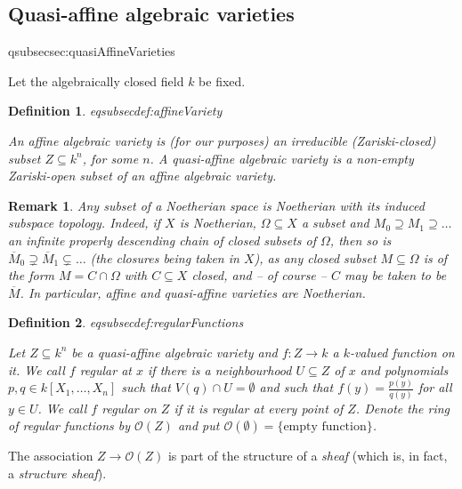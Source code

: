 \documentclass[DIV=14,parskip=full,pointednumbers]{scrartcl}
\theoremstyle{cthm}
\theoremstyle{cvarthm}
\theoremstyle{cdef}
\newtheorem{defi}{Definition}[subsection]
\newtheorem{rem}{Remark}[subsection]
\newcommand{\lbl}[1]{
	\label{#1}
	\ifmmode
	\expandafter\xdef\csname eqsubsec#1\endcsname{\thesubsection}
	\fi
}
\newcommand{\Oo}{\mathcal{O}}
\newcommand{\ov}{\overline}
\begin{document}
	\subsection{Quasi-affine algebraic varieties}\lbl{sec:quasiAffineVarieties}
	Let the algebraically closed field $k$ be fixed.
	\begin{defi}\lbl{def:affineVariety}
		An \emph{affine algebraic variety} is (for our purposes) an irreducible (Zariski-closed) subset $Z\subseteq k^n$, for some $n$. A \emph{quasi-affine algebraic variety} is a non-empty Zariski-open subset of an affine algebraic variety.
	\end{defi}
	\begin{rem}
		Any subset of a Noetherian space is Noetherian with its induced subspace topology. Indeed, if $X$ is Noetherian, $\Omega\subseteq X$ a subset and $M_0\supseteq M_1\supseteq \ldots$ an infinite properly descending chain of closed subsets of $\Omega$, then so is $\ov M_0\supsetneq\ov M_1\subsetneq\ldots$ (the closures being taken in $X$), as any closed subset $M\subseteq\Omega$ is of the form $M=C\cap\Omega$ with $C\subseteq X$ closed, and -- of course -- $C$ may be taken to be $\ov M$. In particular, affine and quasi-affine varieties are Noetherian.
	\end{rem}
	\begin{defi}\lbl{def:regularFunctions}
		Let $Z\subseteq k^n$ be a quasi-affine algebraic variety and $f: Z\to k$ a $k$-valued function on it. We call $f$ \emph{regular at $x$} if there is a neighbourhood $U\subseteq Z$ of $x$ and polynomials $p,q\in k[X_1,\ldots,X_n]$ such that $V(q) \cap U = \emptyset$ and such that $f(y) = \frac{p(y)}{q(y)}$ for all $y\in U$. We call $f$ \emph{regular} on $Z$ if it is regular at every point of $Z$. Denote the ring of regular functions by $\Oo(Z)$ and put $\Oo(\emptyset)=\{\text{empty function}\}$.
	\end{defi}
	The association $Z\to \Oo(Z)$ is part of the structure of a \emph{sheaf} (which is, in fact, a \emph{structure sheaf}).
\end{document}
